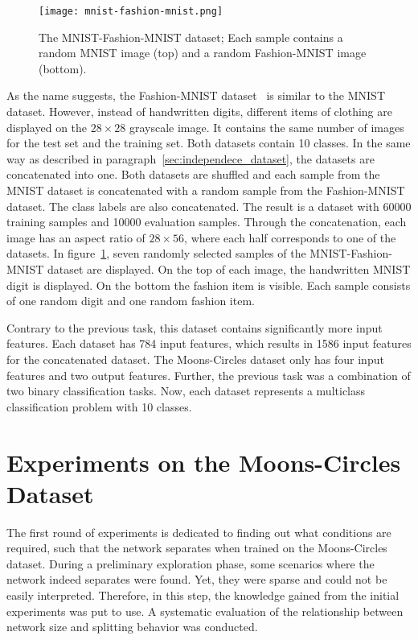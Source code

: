 \begin{figure}[t]
    \centering\texttt{[image: mnist-fashion-mnist.png]}
    \caption[MNIST-Fashion-MNIST dataset]{
        The MNIST-Fashion-MNIST dataset; Each sample contains a random MNIST image (top) and a random Fashion-MNIST image (bottom).
    }\label{fig:mnist_fashion}
\end{figure}

As the name suggests, the Fashion-MNIST dataset~\autocite{fashion} is similar to the MNIST dataset.
However, instead of handwritten digits, different items of clothing are displayed on the $28 \times 28$ grayscale image.
It contains the same number of images for the test set and the training set.
Both datasets contain 10 classes.
In the same way as described in paragraph~\ref{sec:independece_dataset}, the datasets are concatenated into one.
Both datasets are shuffled and each sample from the MNIST dataset is concatenated with a random sample from the Fashion-MNIST dataset.
The class labels are also concatenated.
The result is a dataset with 60000 training samples and 10000 evaluation samples.
Through the concatenation, each image has an aspect ratio of $28 \times 56$, where each half corresponds to one of the datasets.
In figure~\ref{fig:mnist_fashion}, seven randomly selected samples of the  MNIST-Fashion-MNIST dataset are displayed.
On the top of each image, the handwritten MNIST digit is displayed. 
On the bottom the fashion item is visible.
Each sample consists of one random digit and one random fashion item. 

Contrary to the previous task, this dataset contains significantly more input features.
Each dataset has 784 input features, which results in 1586 input features for the concatenated dataset.
The Moons-Circles dataset only has four input features and two output features.
Further, the previous task was a combination of two binary classification tasks.
Now, each dataset represents a multiclass classification problem with 10 classes.

\section{Experiments on the Moons-Circles Dataset}
The first round of experiments is dedicated to finding out what conditions are required, such that the network separates when trained on the Moons-Circles dataset.
During a preliminary exploration phase, some scenarios where the network indeed separates were found.
Yet, they were sparse and could not be easily interpreted.
Therefore, in this step, the knowledge gained from the initial experiments was put to use.
A systematic evaluation of the relationship between network size and splitting behavior was conducted.

